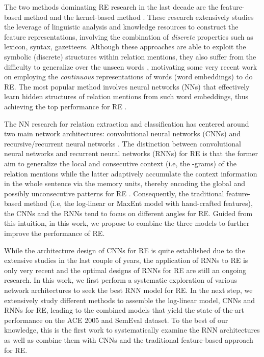 \documentclass[11pt,letterpaper]{article}
\begin{document}
The two methods dominating RE research in the last decade are the feature-based method \cite{Kambhatla:04,Boschee:05,Zhou:05,Grishman:05,Jiang:07,Chan:10,Sun:11} and the kernel-based method \cite{Zelenko:03,Culotta:04,Bunescu:05a,Bunescu:05b,Zhang:06,Zhou:07,Qian:08,Nguyen:09,Plank:13}.  These research extensively studies the leverage of linguistic analysis and knowledge resources to construct the feature representations, involving the combination of {\it discrete} properties such as lexicon, syntax, gazetteers. Although these approaches are able to exploit the symbolic (discrete) structures within relation mentions, they also suffer from the difficulty to generalize over the unseen words \cite{Gormley:15}, motivating some very recent work on employing the {\it continuous} representations of words (word embeddings) to do RE. The most popular method involves neural networks (NNs) that effectively learn hidden structures of relation mentions from such word embeddings, thus achieving the top performance for RE \cite{Zeng:14,Santos:15,Xu:15}.









The NN research for relation extraction and classification has centered around two main network architectures: convolutional neural networks (CNNs) \cite{Santos:15,Zeng:15} and recursive/recurrent neural networks \cite{Socher:12,Xu:15}. The distinction between convolutional neural networks and recurrent neural networks (RNNs) for RE is that the former aim to generalize the local and consecutive context (i.e, the -grams) of the relation mentions \cite{Nguyen:15a} while the latter adaptively accumulate the context information in the whole sentence via the memory units, thereby encoding the global and possibly unconsecutive patterns for RE \cite{Hochreiter:97,Cho:14}. Consequently, the traditional feature-based method (i.e, the log-linear or MaxEnt model with hand-crafted features), the CNNs and the RNNs tend to focus on different angles for RE. Guided from this intuition, in this work, we propose to combine the three models to further improve the performance of RE.







While the architecture design of CNNs for RE is quite established due to the extensive studies in the last couple of years, the application of RNNs to RE is only very recent and the optimal designs of RNNs for RE are still an ongoing research. In this work, we first perform a systematic exploration of various network architectures to seek the best RNN model for RE. In the next step, we extensively study different methods to assemble the log-linear model, CNNs and RNNs for RE, leading to the combined models that yield the state-of-the-art performance on the ACE 2005 and SemEval dataset. To the best of our knowledge, this is the first work to systematically examine the RNN architectures as well as combine them with CNNs and the traditional feature-based approach for RE.
\end{document}
